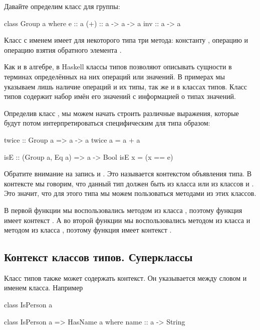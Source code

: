 Давайте определим класс для группы:


\begin{code}
class Group a where
    e   :: a
    (+) :: a -> a -> a
    inv :: a -> a
\end{code}

Класс с именем  имеет для некоторого типа  три метода:
константу , операцию  и операцию
взятия обратного элемента .

Как и в алгебре, в Haskell классы типов позволяют описывать сущности в
терминах определённых на них операций или значений. В примерах мы
указываем лишь наличие операций и их типы, так же и в классах типов.
Класс типов содержит набор имён его значений с информацией о типах
значений.

Определив класс , мы можем начать строить различные выражения,
которые будут потом интерпретироваться специфическим для типа образом:


\begin{code}
twice :: Group a => a -> a
twice a = a + a

isE :: (Group a, Eq a) => a -> Bool
isE x = (x == e)
\end{code}

Обратите внимание на запись  и .
Это называется контекстом объявления типа. В контексте мы говорим, что
данный тип должен быть из класса  или из классов  и
. Это значит, что для этого типа мы можем пользоваться методами
из этих классов.

В первой функции  мы воспользовались методом \In{(+)} из
класса , поэтому функция имеет контекст . А во
второй функции  мы воспользовались методом  из класса
 и методом \In{(==)} из класса , поэтому функция имеет
контекст .

\subsection{Контекст классов типов. Суперклассы}

Класс типов также может содержать контекст. Он указывается между словом
 и именем класса. Например


\begin{code}
class IsPerson a

class IsPerson a => HasName a where
    name :: a -> String
\end{code}

